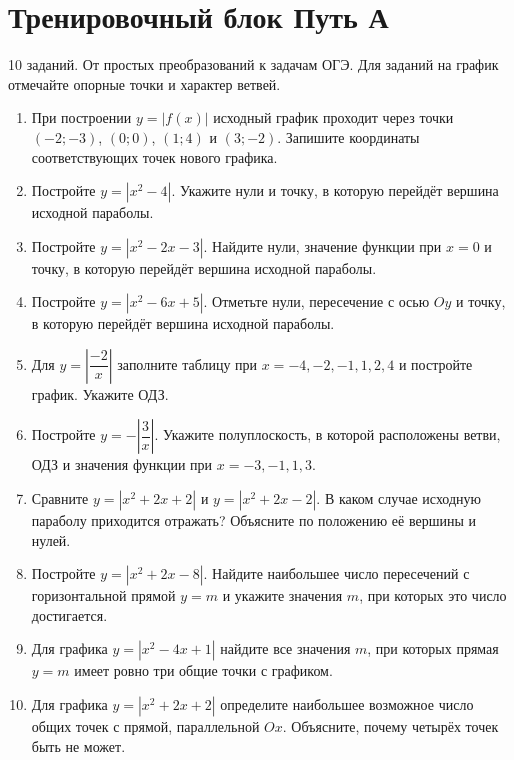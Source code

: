 \documentclass[a4paper,12pt]{article}
\newcommand{\accentsection}[1]{\section*{\color{darkaccent}#1}}
\begin{document}
\clearpage
\accentsection{Тренировочный блок \textbf{\textemdash} Путь А}
\textcolor{softgray}{10 заданий. От простых преобразований к задачам ОГЭ. Для заданий на график отмечайте опорные точки и характер ветвей.}
\begin{enumerate}
\item При построении $y=|f(x)|$ исходный график проходит через точки $(-2;-3)$, $(0;0)$, $(1;4)$ и $(3;-2)$. Запишите координаты соответствующих точек нового графика.

\item Постройте $y=|x^2-4|$. Укажите нули и точку, в которую перейдёт вершина исходной параболы.

\item Постройте $y=|x^2-2x-3|$. Найдите нули, значение функции при $x=0$ и точку, в которую перейдёт вершина исходной параболы.

\item Постройте $y=|x^2-6x+5|$. Отметьте нули, пересечение с осью $Oy$ и точку, в которую перейдёт вершина исходной параболы.

\item Для $y=\left|\dfrac{-2}{x}\right|$ заполните таблицу при $x=-4,-2,-1,1,2,4$ и постройте график. Укажите ОДЗ.

\item Постройте $y=-\left|\dfrac3x\right|$. Укажите полуплоскость, в которой расположены ветви, ОДЗ и значения функции при $x=-3,-1,1,3$.

\item Сравните $y=|x^2+2x+2|$ и $y=|x^2+2x-2|$. В каком случае исходную параболу приходится отражать? Объясните по положению её вершины и нулей.

\item Постройте $y=|x^2+2x-8|$. Найдите наибольшее число пересечений с горизонтальной прямой $y=m$ и укажите значения $m$, при которых это число достигается.

\item Для графика $y=|x^2-4x+1|$ найдите все значения $m$, при которых прямая $y=m$ имеет ровно три общие точки с графиком.

\item Для графика $y=|x^2+2x+2|$ определите наибольшее возможное число общих точек с прямой, параллельной $Ox$. Объясните, почему четырёх точек быть не может.
\end{enumerate}
\end{document}
